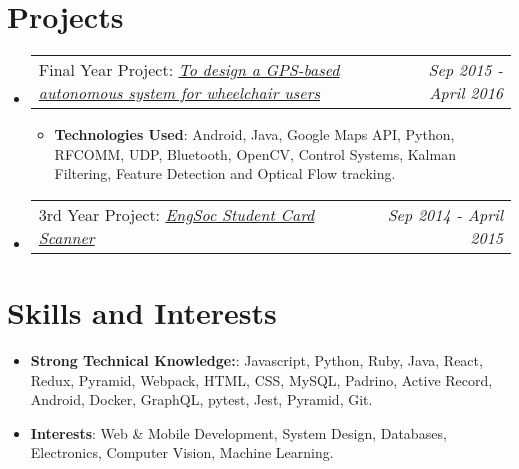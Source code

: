 \documentclass[letterpaper,11pt]{article}
\makeatletter
\newcommand{\resumeItem}[2]{
  \item\small{
    \textbf{#1}{: #2 \vspace{-2pt}}
  }
}
\newcommand{\resumeProjectHeading}[3]{
  \item
    \begin{tabular*}{0.97\textwidth}{l@{\extracolsep{\fill}}r}
      {#1} \textit{#2} & \textit{\small #3}
    \end{tabular*}\vspace{-5pt}
}
\newcommand{\resumeSubItem}[2]{\resumeItem{#1}{#2}\vspace{-4pt}}
\newcommand{\resumeSubHeadingListStart}{\begin{itemize}[leftmargin=*]}
\newcommand{\resumeSubHeadingListEnd}{\end{itemize}}
\newcommand{\resumeItemListStart}{\begin{itemize}}
\makeatother
\begin{document}
\section{Projects}
  \resumeSubHeadingListStart
    \resumeProjectHeading
      {Final Year Project:}{\href{https://github.com/jhurl3y/wheelchair-nav}{To design a GPS-based autonomous system for wheelchair users}}{Sep 2015 - April 2016}
      \resumeItemListStart
        \resumeItem{Technologies Used}
          {Android, Java, Google Maps API, Python, RFCOMM, UDP, Bluetooth, OpenCV, Control Systems, Kalman Filtering, Feature Detection and Optical Flow tracking.}
      \resumeSubHeadingListEnd
    \resumeProjectHeading
      {3rd Year Project:}{\href{https://www.youtube.com/watch?v=6YqNerpiGpM}{EngSoc Student Card Scanner}}{Sep 2014 - April 2015}
  \resumeSubHeadingListEnd

 \section{Skills and Interests}
   \resumeSubHeadingListStart
     \resumeSubItem{Strong Technical Knowledge:}
       {Javascript, Python, Ruby, Java, React, Redux, Pyramid, Webpack, HTML, CSS, MySQL, Padrino, Active Record, Android, Docker, GraphQL, pytest, Jest, Pyramid, Git.}
     \resumeSubItem{Interests}
       {Web \& Mobile Development, System Design, Databases, Electronics, Computer Vision, Machine Learning.}
   \resumeSubHeadingListEnd

\end{document}
